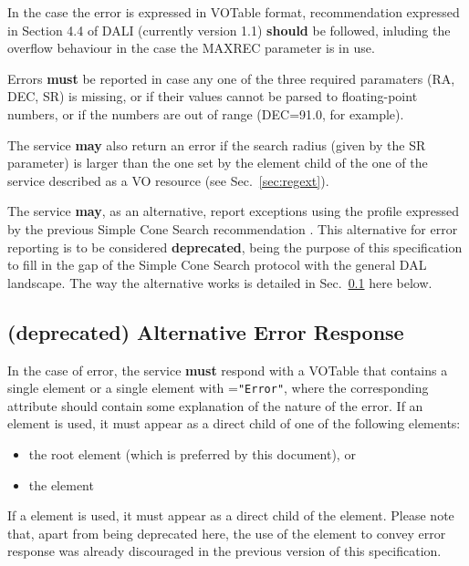 \documentclass[11pt,a4paper]{ivoa}
\begin{document}
In the case the error is expressed in VOTable format, recommendation expressed in Section 4.4 of DALI (currently version 1.1) \textbf{should} be followed, inluding the overflow behaviour in the case the MAXREC parameter is in use.

Errors \textbf{must} be reported in case any one of the three required paramaters (RA, DEC, SR) is missing, 
or if their values cannot be parsed to floating-point numbers, or if the numbers are out of range (DEC=91.0, for example). 

The service \textbf{may} also return an error if the search radius (given by the SR parameter) is larger than the one set by the  element child of the  one of the service described as a VO resource (see Sec.~\ref{sec:regext}).

The service \textbf{may}, as an alternative, report exceptions using the
profile expressed by the previous Simple Cone Search recommendation
\citep[v1.03]{std:SCS}. This alternative for error
reporting is to be considered \textbf{deprecated}, being the purpose of
this specification to fill in the gap of the Simple Cone Search protocol
with the general DAL landscape. The way the alternative works is
detailed in Sec.~\ref{subsec:err103} here below.

\subsection{(\textbf{deprecated}) Alternative Error Response}
\label{subsec:err103}
In the case of error, the service \textbf{must} respond with a VOTable that contains a single  element or a single  element with =\texttt{"Error"}, where the corresponding  attribute should contain some explanation of the nature of the error. If an  element is used, it must appear as a direct child of one of the following elements:
\begin{itemize}
	\item the root  element (which is preferred by this document), or
	\item the  element
\end{itemize}

If a  element is used, it must appear as a direct child of  the  element. Please note that, apart from being deprecated here, the use of the  element to convey error response was already discouraged in the previous version of this specification.
\end{document}
